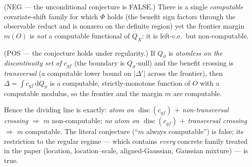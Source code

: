 \begin{theorem}
\label{thm:t2-dichotomy}
\textnormal{(NEG --- the unconditional conjecture is FALSE.)} There is a single
\emph{computable} covariate-shift family for which $\Phi$ holds (the benefit sign factors
through the observable reduct and is nonzero on the definite region) yet the frontier margin
$m(O)$ is \emph{not} a computable functional of $Q_X$: it is left-c.e.\ but non-computable.

\textnormal{(POS --- the conjecture holds under regularity.)} If $Q_\vartheta$ is
\emph{atomless on the discontinuity set of $c_{gf}$} (the boundary is $Q_\vartheta$-null) and
the benefit crossing is \emph{transversal} (a computable lower bound on $|\Delta'|$ across the
frontier), then $\Delta=\int c_{gf}\,\mathrm dQ_\vartheta$ is a computable, strictly-monotone
function of $O$ with a computable modulus, so the frontier and the margin $m$ are computable.

Hence the dividing line is exactly: \emph{atom on $\operatorname{disc}(c_{gf})$ $+$
non-transversal crossing} $\Rightarrow$ $m$ non-computable; \emph{no atom on
$\operatorname{disc}(c_{gf})$ $+$ transversal crossing} $\Rightarrow$ $m$ computable. The
literal conjecture (``$m$ always computable'') is false; its restriction to the regular regime
--- which contains \emph{every} concrete family treated in the paper (location, location--scale,
aligned-Gaussian, Gaussian mixture) --- is true.
\end{theorem}

